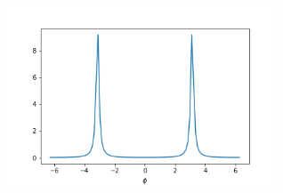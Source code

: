 \begin{ex}
    \label{ex7.15}
    \
    \begin{figure}[H]
        \begin{center}
            \includegraphics[width = 80mm]{../fig/ex7_15.png}
        \end{center}
    \end{figure}
\end{ex}

